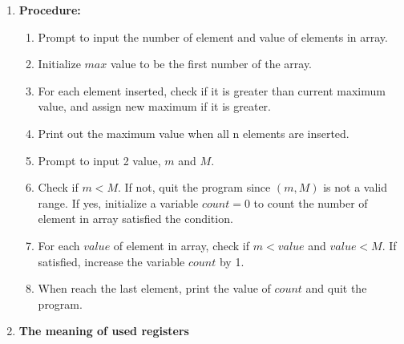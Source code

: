 \documentclass[12pt]{article}
\begin{document}
\begin{enumerate}[label=\textbf{\Roman*}]
        \item \textbf{Procedure:} \\
        \begin{enumerate}
        	\item Prompt to input the number of element and value of elements in array.
        	\item Initialize $max$ value to be the first number of the array.
        	\item For each element inserted, check if it is greater than current maximum value, and assign new maximum if it is greater.
        	\item Print out the maximum value when all n elements are inserted.
        	\item Prompt to input 2 value, $m$ and $M$.
        	\item Check if $m < M$. If not, quit the program since $(m,M)$ is not a valid range. If yes, initialize a variable $count = 0$ to count the number of element in array satisfied the condition.
        	\item For each $value$ of element in array, check if $m < value$ and $value < M$. If satisfied, increase the variable $count$ by 1.
        	\item When reach the last element, print the value of $count$ and quit the program.
        \end{enumerate}
        \item \textbf{The meaning of used registers}
\end{enumerate}
\end{document}
